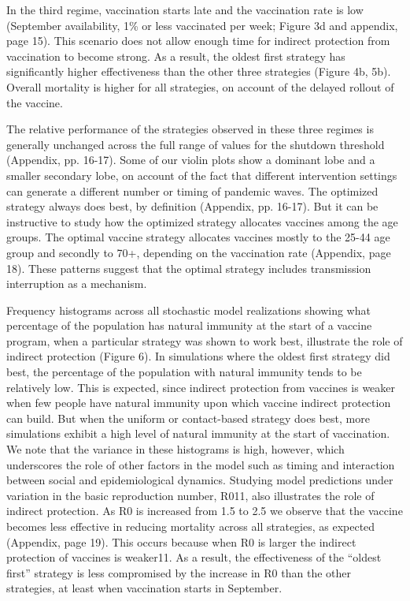 In the third regime, vaccination starts late and the vaccination rate is low (September availability, 1\% or less vaccinated per week; Figure 3d and appendix, page 15). This scenario does not allow enough time for indirect protection from vaccination to become strong.  As a result, the oldest first strategy has significantly higher effectiveness than the other three strategies (Figure 4b, 5b).  Overall mortality is higher for all strategies, on account of the delayed rollout of the vaccine. 
  
The relative performance of the strategies observed in these three regimes is generally unchanged across the full range of values for the shutdown threshold (Appendix, pp. 16-17).  Some of our violin plots show a dominant lobe and a smaller secondary lobe, on account of the fact that different intervention settings can generate a different number or timing of pandemic waves.  The optimized strategy always does best, by definition (Appendix, pp. 16-17). But it can be instructive to study how the optimized strategy allocates vaccines among the age groups. The optimal vaccine strategy allocates vaccines mostly to the 25-44 age group and secondly to 70+, depending on the vaccination rate (Appendix, page 18). These patterns suggest that the optimal strategy includes transmission interruption as a mechanism.   

Frequency histograms across all stochastic model realizations showing what percentage of the population has natural immunity at the start of a vaccine program, when a particular strategy was shown to work best, illustrate the role of indirect protection (Figure 6). In simulations where the oldest first strategy did best, the percentage of the population with natural immunity tends to be relatively low. This is expected, since indirect protection from vaccines is weaker when few people have natural immunity upon which vaccine indirect protection can build.  But when the uniform or contact-based strategy does best, more simulations exhibit a high level of natural immunity at the start of vaccination.  We note that the variance in these histograms is high, however, which underscores the role of other factors in the model such as timing and interaction between social and epidemiological dynamics. Studying model predictions under variation in the basic reproduction number, R011, also illustrates the role of indirect protection. As R0 is increased from 1.5 to 2.5 we observe that the vaccine becomes less effective in reducing mortality across all strategies, as expected (Appendix, page 19). This occurs because when R0 is larger the indirect protection of vaccines is weaker11. As a result, the effectiveness of the “oldest first” strategy is less compromised by the increase in R0 than the other strategies, at least when vaccination starts in September. 

